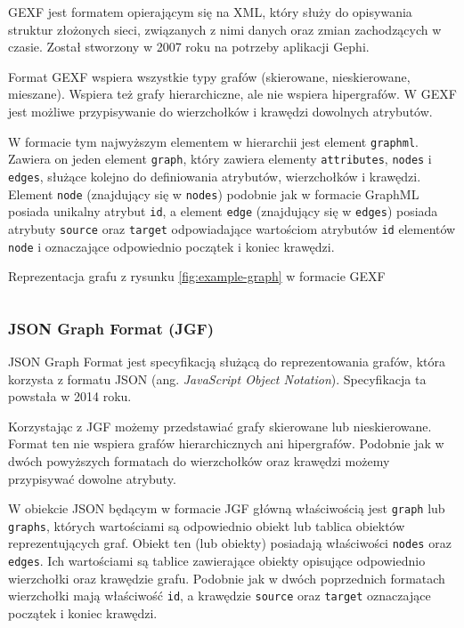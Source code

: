 GEXF jest formatem opierającym się na XML, który służy do opisywania struktur złożonych sieci, związanych z nimi danych oraz zmian zachodzących w czasie. Został stworzony w 2007 roku na potrzeby aplikacji Gephi.  

Format GEXF wspiera wszystkie typy grafów (skierowane, nieskierowane, mieszane). Wspiera też grafy hierarchiczne, ale nie wspiera hipergrafów. W GEXF jest możliwe przypisywanie do wierzchołków i krawędzi dowolnych atrybutów. 

W formacie tym najwyższym elementem w hierarchii jest element \texttt{graphml}. Zawiera on jeden element \texttt{graph}, który zawiera elementy \texttt{attributes}, \texttt{nodes} i \texttt{edges}, służące kolejno do definiowania atrybutów, wierzchołków i krawędzi. Element \texttt{node} (znajdujący się w \texttt{nodes}) podobnie jak w formacie GraphML posiada unikalny atrybut \texttt{id}, a element \texttt{edge} (znajdujący się w \texttt{edges}) posiada atrybuty \texttt{source} oraz \texttt{target} odpowiadające wartościom atrybutów \texttt{id} elementów \texttt{node} i oznaczające odpowiednio początek i koniec krawędzi.  

\begin{listing}[H]
    \caption{Reprezentacja grafu z rysunku \ref{fig:example-graph} w formacie GEXF}
    \inputminted{xml}{example.gexf}
    \label{lst:gexf-example}
\end{listing}

\subsubsection{JSON Graph Format (JGF)} 

JSON Graph Format jest specyfikacją służącą do reprezentowania grafów, która korzysta z formatu JSON (ang. \textit{JavaScript Object Notation}). Specyfikacja ta powstała w 2014 roku. 

Korzystając z JGF możemy przedstawiać grafy skierowane lub nieskierowane. Format ten nie wspiera grafów hierarchicznych ani hipergrafów. Podobnie jak w dwóch powyższych formatach do wierzchołków oraz krawędzi możemy przypisywać dowolne atrybuty. 

W obiekcie JSON będącym w formacie JGF główną właściwością jest \texttt{graph} lub \texttt{graphs}, których wartościami są odpowiednio obiekt lub tablica obiektów reprezentujących graf. Obiekt ten (lub obiekty) posiadają właściwości \texttt{nodes} oraz \texttt{edges}. Ich wartościami są tablice zawierające obiekty opisujące odpowiednio wierzchołki oraz krawędzie grafu. Podobnie jak w dwóch poprzednich formatach wierzchołki mają właściwość \texttt{id}, a krawędzie \texttt{source} oraz \texttt{target} oznaczające początek i koniec krawędzi. 

